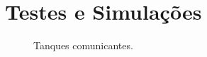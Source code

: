 \chapter{Testes e Simulações}

\begin{center}
  \begin{figure}[b]
    \centering
      
      \caption{Tanques comunicantes.}
      \label{fig:TanquesComunicantes}
  \end{figure}
\end{center}